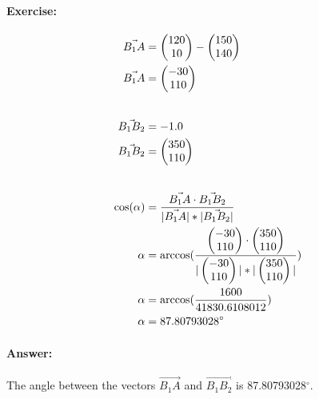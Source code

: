 \paragraph{Exercise:} 
\begin{align}
    \vec{B_1A} &= \vA - \vBOne \\
    \vec{B_1A} &= \vBOneA  \\[20pt]
    \vec{B_1B_2} &= \pgfmathparse{1 - 2} \pgfmathresult \\
    \vec{B_1B_2} &= \vBOneBTwo \\[20pt]
    \cos(\alpha) &= \frac{\vec{B_1A} \cdot \vec{B_1B_2}}{|\vec{B_1A}| * |\vec{B_1B_2}|} \\
    \alpha &= \arccos(\frac{\vBOneA \cdot \vBOneBTwo}{|\vBOneA| * |\vBOneBTwo|}) \\
    \alpha &= \arccos(\frac{1600}{41830.6108012}) \\
    \alpha &= 87.80793028^\circ 
\end{align}

\paragraph{Answer:}
The angle between the vectors $\vec{B_1A}$ and $\vec{B_1B_2}$ is 87.80793028$^\circ$.
